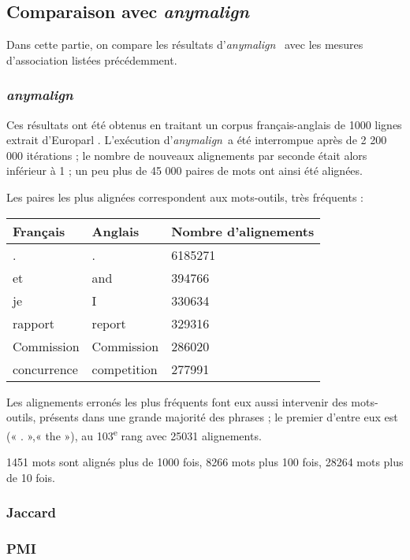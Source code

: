 \documentclass[a4paper,10pt]{article}
\newcommand{\anym}{\emph{anymalign}}
\newcommand{\guill}[1]{« #1 »}
\begin{document}
\subsection{Comparaison avec \anym}

Dans cette partie, on compare les résultats d'\anym~ avec les mesures d'association listées précédemment.

\subsubsection{\anym}

Ces résultats ont été obtenus en traitant un corpus français-anglais de 1000 lignes extrait d'Europarl %
. L'exécution d'\anym~a été interrompue après de 2 200 000 itérations ; le nombre de nouveaux alignements par seconde était alors inférieur à 1 ; un peu plus de 45 000 paires de mots ont ainsi été alignées.

Les paires les plus alignées correspondent aux mots-outils, très fréquents :

\begin{tabular}{|l|l|l|}
\hline
Français & Anglais & Nombre d'alignements \\
\hline
. & . & 6185271 \\
et & and & 394766 \\
je & I & 330634 \\
rapport & report & 329316 \\
Commission & Commission & 286020 \\
concurrence & competition & 277991 \\
\hline
\end{tabular}

Les alignements erronés les plus fréquents font eux aussi intervenir des mots-outils, présents dans une grande majorité des phrases ; le premier d'entre eux est (\guill{.},\guill{the}), au 103\textsuperscript{e} rang avec 25031 alignements.

1451 mots sont alignés plus de 1000 fois, 8266 mots plus 100 fois, 28264 mots plus de 10 fois.

\subsubsection{Jaccard}

\subsubsection{PMI}
\end{document}
